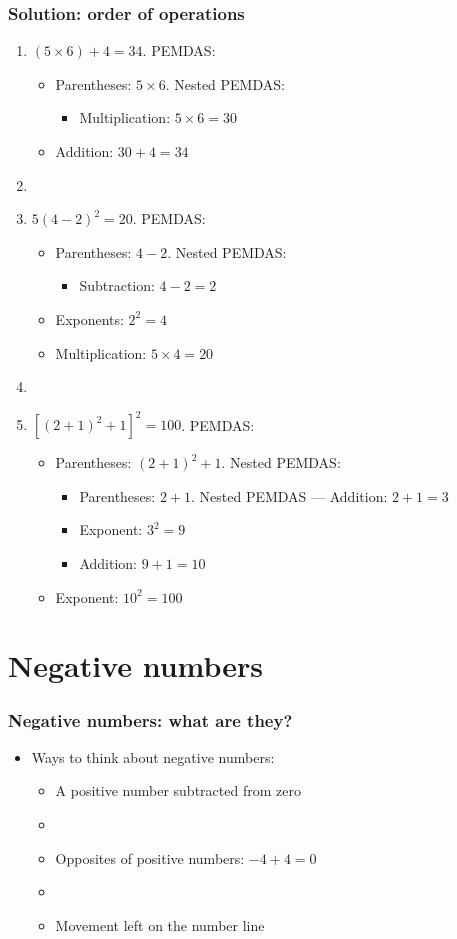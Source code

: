 \documentclass[12pt]{beamer}
\newcommand{\myframe}[1]{\begin{frame} \frametitle{#1}}
\begin{document}
\myframe{Solution: order of operations}
\begin{enumerate}
\item $(5 \times 6) + 4 = 34$. PEMDAS:
\begin{itemize}
\item Parentheses: $5 \times 6$. Nested PEMDAS:
\begin{itemize}
\item Multiplication: $5 \times 6 = 30$
\end{itemize}
\item Addition: $30 + 4 = 34$
\end{itemize}
\item[]
\item $5(4 - 2)^2 = 20$. PEMDAS:
\begin{itemize}
\item Parentheses: $4 - 2$. Nested PEMDAS:
\begin{itemize}
\item Subtraction: $4 - 2 = 2$
\end{itemize}
\item Exponents: $2^2 = 4$
\item Multiplication: $5 \times 4 = 20$
\end{itemize}
\item[]
\item $[(2+1)^2 + 1]^2 = 100$. PEMDAS:
\begin{itemize}
\item Parentheses: $(2 + 1)^2 + 1$. Nested PEMDAS:
\begin{itemize}
\item Parentheses: $2 + 1$. Nested PEMDAS --- Addition: $2 + 1 = 3$
\item Exponent: $3^2 = 9$ 
\item Addition: $9 + 1 = 10$
\end{itemize}
\item Exponent: $10^2 = 100$
\end{itemize}
\end{enumerate}
\end{frame}

\section{Negative numbers}
\myframe{Negative numbers: what are they?}
\begin{itemize}
\item Ways to think about negative numbers:
\begin{itemize}
\item A positive number subtracted from zero
\item[]
\item Opposites of positive numbers: $-4 + 4 = 0$
\item[]
\item Movement left on the number line
\end{itemize}
\end{itemize}
\end{frame}
\end{document}
